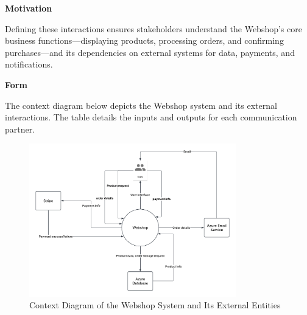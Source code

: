 \textbf{Motivation}

Defining these interactions ensures stakeholders understand the Webshop’s core business functions—displaying products, processing orders, and confirming purchases—and its dependencies on external systems for data, payments, and notifications.

\textbf{Form}

The context diagram below depicts the Webshop system and its external interactions. The table details the inputs and outputs for each communication partner.

\begin{figure}[h]
  \centering
  \includegraphics[width=0.8\textwidth]{images/webshop_context_diagram.pdf} 
  \caption{Context Diagram of the Webshop System and Its External Entities}
  \label{fig:webshop-context}
\end{figure}

\begin{table}[h]
  \centering
  \caption{Inputs and Outputs for Webshop Communication Partners}
  \label{tab:webshop-business-context}
\end{table}

